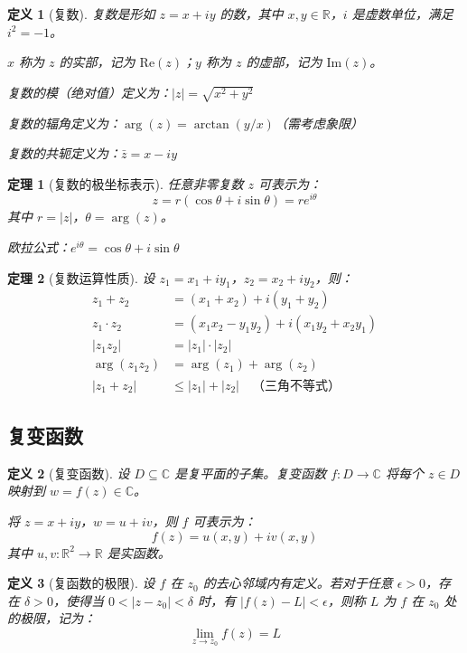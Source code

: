 \documentclass[12pt]{article}
\newtheorem{theorem}{定理}[section]
\newtheorem{definition}{定义}[section]
\begin{document}
\begin{definition}[复数]
复数是形如 $z = x + iy$ 的数，其中 $x, y \in \mathbb{R}$，$i$ 是虚数单位，满足 $i^2 = -1$。

$x$ 称为 $z$ 的实部，记为 $\text{Re}(z)$；$y$ 称为 $z$ 的虚部，记为 $\text{Im}(z)$。

复数的模（绝对值）定义为：$|z| = \sqrt{x^2 + y^2}$

复数的辐角定义为：$\arg(z) = \arctan(y/x)$（需考虑象限）

复数的共轭定义为：$\bar{z} = x - iy$
\end{definition}

\begin{theorem}[复数的极坐标表示]
任意非零复数 $z$ 可表示为：
$$z = r(\cos\theta + i\sin\theta) = re^{i\theta}$$
其中 $r = |z|$，$\theta = \arg(z)$。

欧拉公式：$e^{i\theta} = \cos\theta + i\sin\theta$
\end{theorem}

\begin{theorem}[复数运算性质]
设 $z_1 = x_1 + iy_1$，$z_2 = x_2 + iy_2$，则：
\begin{align}
z_1 + z_2 &= (x_1 + x_2) + i(y_1 + y_2) \\
z_1 \cdot z_2 &= (x_1x_2 - y_1y_2) + i(x_1y_2 + x_2y_1) \\
|z_1 z_2| &= |z_1| \cdot |z_2| \\
\arg(z_1 z_2) &= \arg(z_1) + \arg(z_2) \\
|z_1 + z_2| &\leq |z_1| + |z_2| \quad \text{（三角不等式）}
\end{align}
\end{theorem}

\subsection{复变函数}

\begin{definition}[复变函数]
设 $D \subseteq \mathbb{C}$ 是复平面的子集。复变函数 $f: D \to \mathbb{C}$ 将每个 $z \in D$ 映射到 $w = f(z) \in \mathbb{C}$。

将 $z = x + iy$，$w = u + iv$，则 $f$ 可表示为：
$$f(z) = u(x, y) + iv(x, y)$$
其中 $u, v: \mathbb{R}^2 \to \mathbb{R}$ 是实函数。
\end{definition}

\begin{definition}[复函数的极限]
设 $f$ 在 $z_0$ 的去心邻域内有定义。若对于任意 $\epsilon > 0$，存在 $\delta > 0$，使得当 $0 < |z - z_0| < \delta$ 时，有 $|f(z) - L| < \epsilon$，则称 $L$ 为 $f$ 在 $z_0$ 处的极限，记为：
$$\lim_{z \to z_0} f(z) = L$$
\end{definition}
\end{document}
